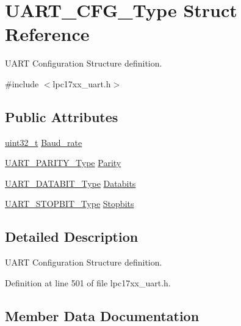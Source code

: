 \hypertarget{struct_u_a_r_t___c_f_g___type}{}\section{U\+A\+R\+T\+\_\+\+C\+F\+G\+\_\+\+Type Struct Reference}
\label{struct_u_a_r_t___c_f_g___type}


U\+A\+RT Configuration Structure definition.  




{\ttfamily \#include $<$lpc17xx\+\_\+uart.\+h$>$}

\subsection*{Public Attributes}
\begin{DoxyCompactItemize}
\item 
\hyperlink{_p_e___types_8h_a33594304e786b158f3fb30289278f5af}{uint32\+\_\+t} \hyperlink{struct_u_a_r_t___c_f_g___type_a7065cb976e4b4d0affc0ee94113eebb2}{Baud\+\_\+rate}
\item 
\hyperlink{group___u_a_r_t___public___types_ga66fa9d836eb6f7035939427e6f8cc318}{U\+A\+R\+T\+\_\+\+P\+A\+R\+I\+T\+Y\+\_\+\+Type} \hyperlink{struct_u_a_r_t___c_f_g___type_aabca9f673560eb77a5c3136e766c55e4}{Parity}
\item 
\hyperlink{group___u_a_r_t___public___types_ga2b8c6f7ae8c1ff3557b3c9b67be69648}{U\+A\+R\+T\+\_\+\+D\+A\+T\+A\+B\+I\+T\+\_\+\+Type} \hyperlink{struct_u_a_r_t___c_f_g___type_a9186b2309198fd63e0ef9d078c265220}{Databits}
\item 
\hyperlink{group___u_a_r_t___public___types_gaa539c23e185a76d77b3c9efc3d62b68c}{U\+A\+R\+T\+\_\+\+S\+T\+O\+P\+B\+I\+T\+\_\+\+Type} \hyperlink{struct_u_a_r_t___c_f_g___type_afbf7b4f60c9d420b2bb41b58bb0212f6}{Stopbits}
\end{DoxyCompactItemize}


\subsection{Detailed Description}
U\+A\+RT Configuration Structure definition. 

Definition at line 501 of file lpc17xx\+\_\+uart.\+h.



\subsection{Member Data Documentation}
